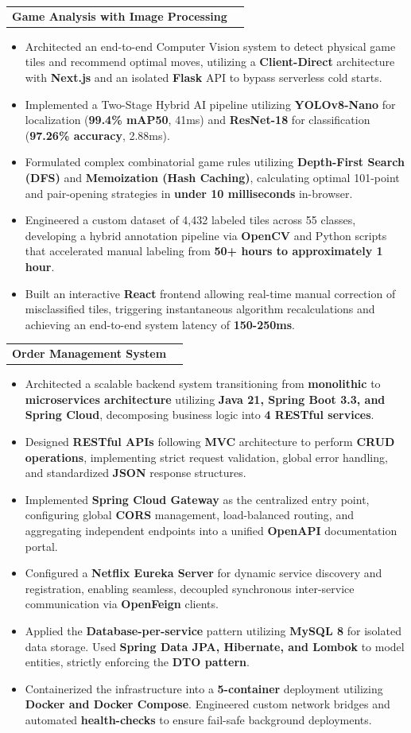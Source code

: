 \documentclass[letterpaper,11pt]{article}
\newcommand{\resumeItem}[1]{
  \item\small{
    {#1 \vspace{-4pt}}
  }
}
\newcommand{\resumeProjectHeading}[2]{
    \item
    \begin{tabularx}{0.97\textwidth}{X r}
      \textbf{#1} & #2 \\
    \end{tabularx}\vspace{-5pt}
}
\newcommand{\resumeItemListStart}{\begin{itemize}}
\newcommand{\resumeItemListEnd}{\end{itemize}\vspace{-5pt}}
\begin{document}
          \resumeProjectHeading
          {\textbf{Game Analysis with Image Processing} }{}
          \resumeItemListStart
            \resumeItem{Architected an end-to-end Computer Vision system to detect physical game tiles and recommend optimal moves, utilizing a \textbf{Client-Direct} architecture with \textbf{Next.js} and an isolated \textbf{Flask} API to bypass serverless cold starts.}
            \resumeItem{Implemented a Two-Stage Hybrid AI pipeline utilizing \textbf{YOLOv8-Nano} for localization (\textbf{99.4\% mAP50}, 41ms) and \textbf{ResNet-18} for classification (\textbf{97.26\% accuracy}, 2.88ms).}
            \resumeItem{Formulated complex combinatorial game rules utilizing \textbf{Depth-First Search (DFS)} and \textbf{Memoization (Hash Caching)}, calculating optimal 101-point and pair-opening strategies in \textbf{under 10 milliseconds} in-browser.}
            \resumeItem{Engineered a custom dataset of 4,432 labeled tiles across 55 classes, developing a hybrid annotation pipeline via \textbf{OpenCV} and Python scripts that accelerated manual labeling from \textbf{50+ hours to approximately 1 hour}.}
            \resumeItem{Built an interactive \textbf{React} frontend allowing real-time manual correction of misclassified tiles, triggering instantaneous algorithm recalculations and achieving an end-to-end system latency of \textbf{150-250ms}.}
          \resumeItemListEnd

        \resumeProjectHeading
          {\textbf{Order Management System} }{}
          \resumeItemListStart
            \resumeItem{Architected a scalable backend system transitioning from \textbf{monolithic} to \textbf{microservices architecture} utilizing \textbf{Java 21, Spring Boot 3.3, and Spring Cloud}, decomposing business logic into \textbf{4 RESTful services}.}
            \resumeItem{Designed \textbf{RESTful APIs} following \textbf{MVC} architecture to perform \textbf{CRUD operations}, implementing strict request validation, global error handling, and standardized \textbf{JSON} response structures.}
            \resumeItem{Implemented \textbf{Spring Cloud Gateway} as the centralized entry point, configuring global \textbf{CORS} management, load-balanced routing, and aggregating independent endpoints into a unified \textbf{OpenAPI} documentation portal.}
            \resumeItem{Configured a \textbf{Netflix Eureka Server} for dynamic service discovery and registration, enabling seamless, decoupled synchronous inter-service communication via \textbf{OpenFeign} clients.}
            \resumeItem{Applied the \textbf{Database-per-service} pattern utilizing \textbf{MySQL 8} for isolated data storage. Used \textbf{Spring Data JPA, Hibernate, and Lombok} to model entities, strictly enforcing the \textbf{DTO pattern}.}
            \resumeItem{Containerized the infrastructure into a \textbf{5-container} deployment utilizing \textbf{Docker and Docker Compose}. Engineered custom network bridges and automated \textbf{health-checks} to ensure fail-safe background deployments.}
          \resumeItemListEnd
\end{document}
